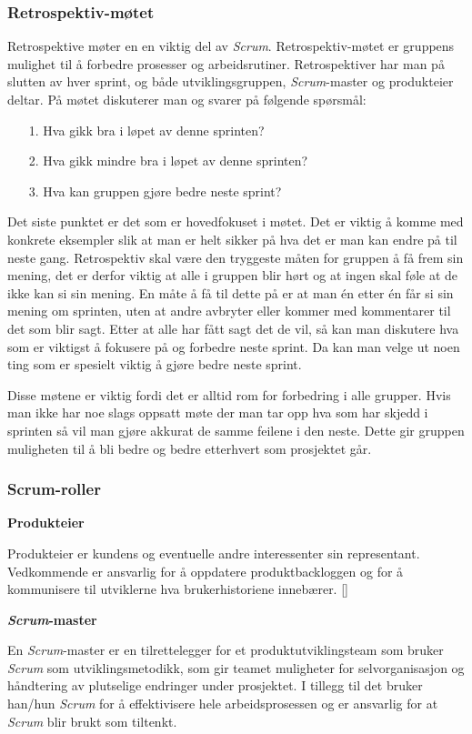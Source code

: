 \documentclass[12pt,a4paper,norsk]{article}
\begin{document}
	\subsubsection{Retrospektiv-møtet}
	Retrospektive møter en en viktig del av \textit{Scrum}. Retrospektiv-møtet er gruppens mulighet til å forbedre prosesser og arbeidsrutiner. Retrospektiver har man på slutten av hver sprint, og både utviklingsgruppen, \textit{Scrum}-master og produkteier deltar. På møtet diskuterer man og svarer på følgende spørsmål:
	\begin{itemize}
    \item[1.] Hva gikk bra i løpet av denne sprinten?
    \item[2.] Hva gikk mindre bra i løpet av denne sprinten?
    \item[3.] Hva kan gruppen gjøre bedre neste sprint?
    \end{itemize}
    Det siste punktet er det som er hovedfokuset i møtet. Det er viktig å komme med konkrete eksempler slik at man er helt sikker på hva det er man kan endre på til neste gang. Retrospektiv skal være den tryggeste måten for gruppen å få frem sin mening, det er derfor viktig at alle i gruppen blir hørt og at ingen skal føle at de ikke kan si sin mening. En måte å få til dette på er at man én etter én får si sin mening om sprinten, uten at andre avbryter eller kommer med kommentarer til det som blir sagt. Etter at alle har fått sagt det de vil, så kan man diskutere hva som er viktigst å fokusere på og forbedre neste sprint. Da kan man velge ut noen ting som er spesielt viktig å gjøre bedre neste sprint. 

    Disse møtene er viktig fordi det er alltid rom for forbedring i alle grupper. Hvis man ikke har noe slags oppsatt møte der man tar opp hva som har skjedd i sprinten så vil man gjøre akkurat de samme feilene i den neste. Dette gir gruppen muligheten til å bli bedre og bedre etterhvert som prosjektet går. 
    \cite[side 82 - 88]{kniberg}
	\subsubsection{Scrum-roller}\label{scrumroller}
	\textbf {Produkteier}
    \par Produkteier er kundens og eventuelle andre interessenter sin representant. Vedkommende er ansvarlig for å oppdatere  produktbackloggen og for å kommunisere til utviklerne hva brukerhistoriene innebærer.
    [\cite{scrumguides}]
    
    \bigskip \noindent \textbf{\textit{Scrum}-master}
    \par En \textit{Scrum}-master er en tilrettelegger for et produktutviklingsteam som bruker \textit{Scrum} som utviklingsmetodikk, som gir teamet muligheter for selvorganisasjon og håndtering av plutselige endringer under prosjektet. I tillegg til det bruker han/hun \textit{Scrum} for å effektivisere hele arbeidsprosessen og er ansvarlig for at \textit{Scrum} blir brukt som tiltenkt.
 
\end{document}
